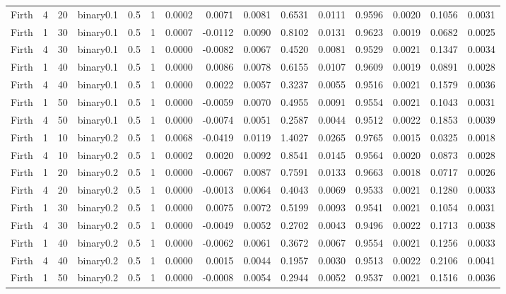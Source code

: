 \begin{longtable}{rrrrrrrrrrrrrrr}
  Firth & 4 & 20 & binary0.1 & 0.5 & 1 & 0.0002 & 0.0071 & 0.0081 & 0.6531 & 0.0111 & 0.9596 & 0.0020 & 0.1056 & 0.0031 \\ 
  Firth & 1 & 30 & binary0.1 & 0.5 & 1 & 0.0007 & -0.0112 & 0.0090 & 0.8102 & 0.0131 & 0.9623 & 0.0019 & 0.0682 & 0.0025 \\ 
  Firth & 4 & 30 & binary0.1 & 0.5 & 1 & 0.0000 & -0.0082 & 0.0067 & 0.4520 & 0.0081 & 0.9529 & 0.0021 & 0.1347 & 0.0034 \\ 
  Firth & 1 & 40 & binary0.1 & 0.5 & 1 & 0.0000 & 0.0086 & 0.0078 & 0.6155 & 0.0107 & 0.9609 & 0.0019 & 0.0891 & 0.0028 \\ 
  Firth & 4 & 40 & binary0.1 & 0.5 & 1 & 0.0000 & 0.0022 & 0.0057 & 0.3237 & 0.0055 & 0.9516 & 0.0021 & 0.1579 & 0.0036 \\ 
  Firth & 1 & 50 & binary0.1 & 0.5 & 1 & 0.0000 & -0.0059 & 0.0070 & 0.4955 & 0.0091 & 0.9554 & 0.0021 & 0.1043 & 0.0031 \\ 
  Firth & 4 & 50 & binary0.1 & 0.5 & 1 & 0.0000 & -0.0074 & 0.0051 & 0.2587 & 0.0044 & 0.9512 & 0.0022 & 0.1853 & 0.0039 \\ 
  Firth & 1 & 10 & binary0.2 & 0.5 & 1 & 0.0068 & -0.0419 & 0.0119 & 1.4027 & 0.0265 & 0.9765 & 0.0015 & 0.0325 & 0.0018 \\ 
  Firth & 4 & 10 & binary0.2 & 0.5 & 1 & 0.0002 & 0.0020 & 0.0092 & 0.8541 & 0.0145 & 0.9564 & 0.0020 & 0.0873 & 0.0028 \\ 
  Firth & 1 & 20 & binary0.2 & 0.5 & 1 & 0.0000 & -0.0067 & 0.0087 & 0.7591 & 0.0133 & 0.9663 & 0.0018 & 0.0717 & 0.0026 \\ 
  Firth & 4 & 20 & binary0.2 & 0.5 & 1 & 0.0000 & -0.0013 & 0.0064 & 0.4043 & 0.0069 & 0.9533 & 0.0021 & 0.1280 & 0.0033 \\ 
  Firth & 1 & 30 & binary0.2 & 0.5 & 1 & 0.0000 & 0.0075 & 0.0072 & 0.5199 & 0.0093 & 0.9541 & 0.0021 & 0.1054 & 0.0031 \\ 
  Firth & 4 & 30 & binary0.2 & 0.5 & 1 & 0.0000 & -0.0049 & 0.0052 & 0.2702 & 0.0043 & 0.9496 & 0.0022 & 0.1713 & 0.0038 \\ 
  Firth & 1 & 40 & binary0.2 & 0.5 & 1 & 0.0000 & -0.0062 & 0.0061 & 0.3672 & 0.0067 & 0.9554 & 0.0021 & 0.1256 & 0.0033 \\ 
  Firth & 4 & 40 & binary0.2 & 0.5 & 1 & 0.0000 & 0.0015 & 0.0044 & 0.1957 & 0.0030 & 0.9513 & 0.0022 & 0.2106 & 0.0041 \\ 
  Firth & 1 & 50 & binary0.2 & 0.5 & 1 & 0.0000 & -0.0008 & 0.0054 & 0.2944 & 0.0052 & 0.9537 & 0.0021 & 0.1516 & 0.0036 \\ 

\end{longtable}
